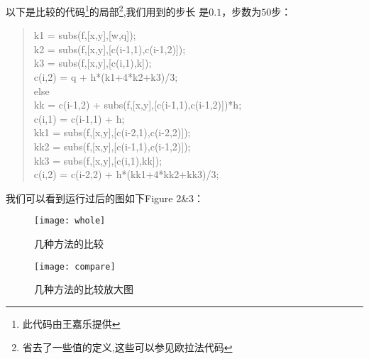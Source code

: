 \documentclass[a4paper,12pt]{article}
\begin{document}
以下是比较的代码\footnote{此代码由王嘉乐提供}的局部\footnote{省去了一些值的定义,这些可以参见欧拉法代码},我们用到的步长
是$0.1$，步数为$50$步：
\begin{quote}
\small{
    k1 = subs(f,[x,y],[w,q]);\\
    k2 = subs(f,[x,y],[c(i-1,1),c(i-1,2)]);\\
    k3 = subs(f,[x,y],[c(i,1),k]);\\
    c(i,2) = q + h*(k1+4*k2+k3)/3;\\
    else\\
    kk = c(i-1,2) + subs(f,[x,y],[c(i-1,1),c(i-1,2)])*h;\\
    c(i,1) = c(i-1,1) + h;\\
    kk1 = subs(f,[x,y],[c(i-2,1),c(i-2,2)]);\\
    kk2 = subs(f,[x,y],[c(i-1,1),c(i-1,2)]);\\
    kk3 = subs(f,[x,y],[c(i,1),kk]);\\
    c(i,2) = c(i-2,2) + h*(kk1+4*kk2+kk3)/3;\\
}
\end{quote}
\par
我们可以看到运行过后的图如下Figure 2\&3：
\begin{figure*}[thispage]
\begin{minipage}[t]{0.5\textwidth}
\centering
\texttt{[image: whole]}
\caption{几种方法的比较}
\end{minipage}%
\begin{minipage}[t]{0.5\textwidth}
\centering
\texttt{[image: compare]}
\caption{几种方法的比较放大图}
\end{minipage}%
\end{figure*}
\end{document}
